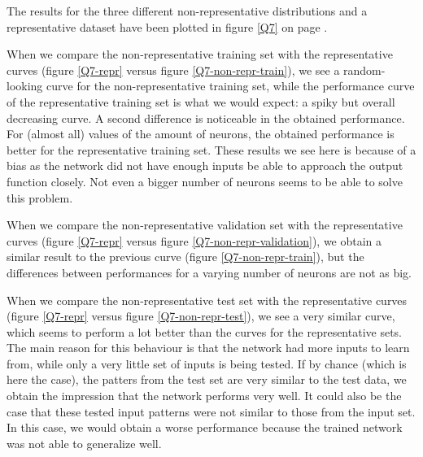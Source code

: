 \documentclass[12pt, a4paper]{article}
\begin{document}
The results for the three different non-representative distributions and a representative dataset have been plotted in figure \ref{Q7} on page \pageref{Q7}. 

When we compare the non-representative training set with the representative curves (figure \ref{Q7-repr} versus figure \ref{Q7-non-repr-train}), we see a random-looking curve for the non-representative training set, while the performance curve of the representative training set is what we would expect: a spiky but overall decreasing curve. A second difference is noticeable in the obtained performance. For (almost all) values of the amount of neurons, the obtained performance is better for the representative training set. These results we see here is because of a bias as the network did not have enough inputs be able to approach the output function closely. Not even a bigger number of neurons seems to be able to solve this problem.

When we compare the non-representative validation set with the representative curves (figure \ref{Q7-repr} versus figure \ref{Q7-non-repr-validation}), we obtain a similar result to the previous curve (figure \ref{Q7-non-repr-train}), but the differences between performances for a varying number of neurons are not as big.

When we compare the non-representative test set with the representative curves (figure \ref{Q7-repr} versus figure \ref{Q7-non-repr-test}), we see a very similar curve, which seems to perform a lot better than the curves for the representative sets. The main reason for this behaviour is that the network had more inputs to learn from, while only a very little set of inputs is being tested. If by chance (which is here the case), the patters from the test set are very similar to the test data, we obtain the impression that the network performs very well. It could also be the case that these tested input patterns were not similar to those from the input set. In this case, we would obtain a worse performance because the trained network was not able to generalize well.
\end{document}
